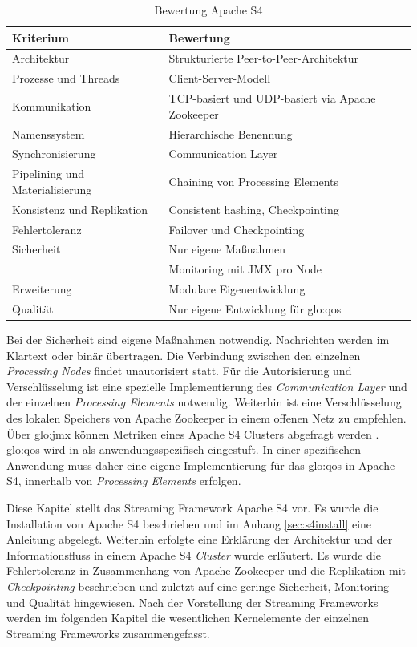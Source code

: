 \begin{table}[!ht]
	\centering
		\begin{tabular}{@{}ll@{}} \toprule
			\textbf{Kriterium} & \textbf{Bewertung} \\ \midrule
			Architektur & Strukturierte Peer-to-Peer-Architektur \\
			Prozesse und Threads & Client-Server-Modell \\
			Kommunikation & TCP-basiert und UDP-basiert via Apache Zookeeper \\
			Namenssystem & Hierarchische Benennung \\
			Synchronisierung & Communication Layer \\
			Pipelining und Materialisierung & Chaining von Processing Elements  \\
			Konsistenz und Replikation & Consistent hashing, Checkpointing \\
			Fehlertoleranz & Failover und Checkpointing \\ 
			Sicherheit & Nur eigene Maßnahmen \\
			& Monitoring mit JMX pro Node \\
			Erweiterung & Modulare Eigenentwicklung \\
			Qualität & Nur eigene Entwicklung für \gls{glo:qos}  \\
			\bottomrule			
		\end{tabular}
	\caption{Bewertung Apache S4}
	\label{tab:bews4}
\end{table}

Bei der Sicherheit sind eigene Maßnahmen notwendig. Nachrichten werden im Klartext oder binär übertragen. Die Verbindung zwischen den einzelnen \textit{Processing Nodes} findet unautorisiert statt. Für die Autorisierung und Verschlüsselung ist eine spezielle Implementierung des \textit{Communication Layer} und der einzelnen \textit{Processing Elements} notwendig. Weiterhin ist eine Verschlüsselung des lokalen Speichers von Apache Zookeeper in einem offenen Netz zu empfehlen. Über \gls{glo:jmx} können Metriken eines Apache S4 Clusters abgefragt werden . \gls{glo:qos} wird in  als anwendungsspezifisch eingestuft. In einer spezifischen Anwendung muss daher eine eigene Implementierung für das \gls{glo:qos} in Apache S4, innerhalb von \textit{Processing Elements} erfolgen.


Diese Kapitel stellt das Streaming Framework Apache S4 vor. Es wurde die Installation von Apache S4 beschrieben und im Anhang \ref{sec:s4install} eine Anleitung abgelegt. Weiterhin erfolgte eine Erklärung der Architektur und der Informationsfluss in einem Apache S4 \textit{Cluster} wurde erläutert. Es wurde die Fehlertoleranz in Zusammenhang von Apache Zookeeper und die Replikation mit \textit{Checkpointing} beschrieben und zuletzt auf eine geringe Sicherheit, Monitoring und Qualität hingewiesen. Nach der Vorstellung der Streaming Frameworks werden im folgenden Kapitel die wesentlichen Kernelemente der einzelnen Streaming Frameworks zusammengefasst.